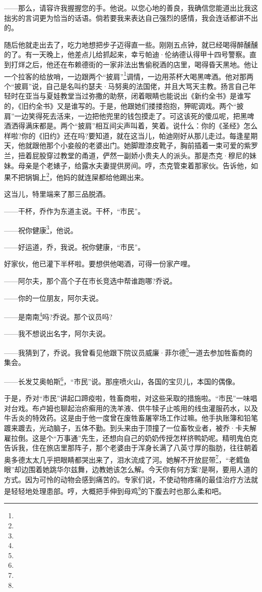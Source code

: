 \par ——那么，请容许我握握您的手。他说。以您心地的善良，我确信您能道出比我这拙劣的言词更为恰当的话语。倘若要我来表达自己强烈的感情，我会连话都讲不出的。
\par 随后他就走出去了，吃力地想把步子迈得直一些。刚刚五点钟，就已经喝得醉醺醺的了。有一天晚上，他差点儿给抓起来，幸亏帕迪·伦纳德认得甲十四号警察。直到打烊之后，他还在布赖德街的一家非法出售偷税酒的店里，喝得昏天黑地。他让一个拉客的给放哨，一边跟两个“披肩”\footnote{}调情，一边用茶杯大喝黑啤酒。他对那两个“披肩”说，自己是名叫约瑟夫·马努奥的法国佬，并且大骂天主教。扬言自己年轻时在亚当与夏娃教堂当过弥撒的助祭，闭着眼睛也能说出《新约全书》是谁写的，《旧约全书》又是谁写的。于是，他跟她们搂搂抱抱，狎昵调戏。两个“披肩”一边笑得死去活来，一边把他兜里的钱包摸走了。可这该死的傻瓜呢，把黑啤酒洒得满床都是。两个“披肩”相互间尖声叫着，笑着。说什么：你的《圣经》怎么样啦?你的《旧约》还在吗?要知道，就在这当儿，帕迪刚好从那儿走过。每逢星期天，他就跟他那个小妾般的老婆出门。她脚蹬漆皮靴子，胸前插着一束可爱的紫罗兰，扭着屁股穿过教堂的甬道，俨然一副娇小贵夫人的派头。那是杰克·穆尼的妹妹。母亲是个老婊子，给露水夫妻提供房间。哼，杰克管束着那家伙。告诉他，如果不把锅锔上\footnote{}，他妈的就连屎都给他踢出来。
\par 这当儿，特里端来了那三品脱酒。
\par ——干杯，乔作为东道主说。干杯，“市民”。
\par ——祝你健康\footnote{}，他说。
\par ——好运道，乔，我说。祝你健康，“市民”。
\par 好家伙，他已灌下半杯啦。要想供他喝酒，可得一份家产哩。
\par ——阿尔夫，那个高个子在市长竞选中帮谁跑哪?乔说。
\par ——你的一位朋友，阿尔夫说。
\par ——是南南\footnote{}吗?乔说。那个议员吗?
\par ——我不想说出名字，阿尔夫说。
\par ——我猜到了，乔说。我曾看见他跟下院议员威廉·菲尔德\footnote{}一道去参加牲畜商的集会。
\par ——长发艾奥帕斯\footnote{}，“市民”说。那座喷火山，各国的宝贝儿，本国的偶像。
\par 于是，乔对“市民”讲起口蹄疫啦，牲畜商啦，对这些采取的措施啦。“市民”一味唱对台戏。布卢姆也聊起治疥癣用的洗羊液、供牛犊子止咳用的线虫灌服药水，以及牛舌炎的特效药。这是由于他一度曾在废牲畜屠宰场工作过嘛。他手执账簿和铅笔踱来踱去，光动脑子，五体不勤。到头来由于顶撞了一位畜牧业者，被乔·卡夫解雇拉倒。这是个“万事通”先生，还想向自己的奶奶传授怎样挤鸭奶呢。精明鬼伯克告诉我，住在旅店里那阵子，那个老婆由于浑身长满了八英寸厚的脂肪，往往朝着奥多德太太几乎把眼睛都哭出来了，泪水流成了河。她解不开放屁带\footnote{}，“老鳕鱼眼”却边围着她跳华尔兹舞，边教她该怎么解。今天你有何方案?是啊，要用人道的方式。因为可怜的动物会感到痛苦的。专家们说，不使动物疼痛的最佳治疗方法就是轻轻地处理患部。哼，大概把手伸到母鸡\footnote{}的下腹去时也那么柔和吧。
